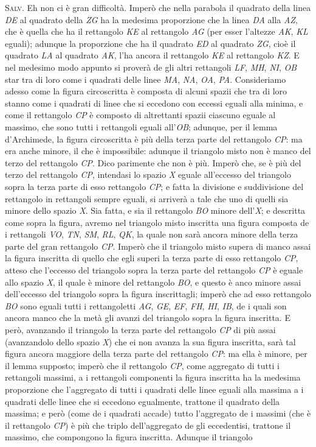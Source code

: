 \documentclass[11pt,twoside,openany]{book}
\newcommand{\speaker}[1]{\textcolor{rubric}{\textsc{#1}}\space}
\begin{document}
\speaker{Salv.} Eh non ci è gran difficoltà. Imperò che nella parabola il quadrato della linea \emph{DE} al quadrato della \emph{ZG} ha la medesima proporzione che la linea \emph{DA} alla \emph{AZ}, che è quella che ha il rettangolo \emph{KE} al rettangolo \emph{AG} (per esser l'altezze \emph{AK}, \emph{KL} eguali); adunque la proporzione che ha il quadrato \emph{ED} al quadrato \emph{ZG}, cioè il quadrato \emph{LA} al quadrato \emph{AK}, l'ha ancora il rettangolo \emph{KE} al rettangolo \emph{KZ}. E nel medesimo modo appunto si proverà de gli altri rettangoli \emph{LF}, \emph{MH}, \emph{NI}, \emph{OB} star tra di loro come i quadrati delle linee \emph{MA}, \emph{NA}, \emph{OA}, \emph{PA}. Consideriamo adesso come la figura circoscritta è composta di alcuni spazii che tra di loro stanno come i quadrati di linee che si eccedono con eccessi eguali alla minima, e come il rettangolo \emph{CP} è composto di altrettanti spazii ciascuno eguale al massimo, che sono tutti i rettangoli eguali all'\emph{OB}; adunque, per il lemma d'Archimede, la figura circoscritta è più della terza parte del rettangolo \emph{CP}: ma era anche minore, il che è impossibile: adunque il triangolo misto non è manco del terzo del rettangolo \emph{CP}. Dico parimente che non è più. Imperò che, se è più del terzo del rettangolo \emph{CP}, intendasi lo spazio \emph{X} eguale all'eccesso del triangolo sopra la terza parte di esso rettangolo \emph{CP}; e fatta la divisione e suddivisione del rettangolo in rettangoli sempre eguali, si arriverà a tale che uno di quelli sia minore dello spazio \emph{X}. Sia fatta, e sia il rettangolo \emph{BO} minore dell'\emph{X}; e descritta come sopra la figura, avremo nel triangolo misto inscritta una figura composta de i rettangoli \emph{VO}, \emph{TN}, \emph{SM}, \emph{RL}, \emph{QK}, la quale non sarà ancora minore della terza parte del gran rettangolo \emph{CP}. Imperò che il triangolo misto supera di manco assai la figura inscritta di quello che egli superi la terza parte di esso rettangolo \emph{CP}, atteso che l'eccesso del triangolo sopra la terza parte del rettangolo \emph{CP} è eguale allo spazio \emph{X}, il quale è minore del rettangolo \emph{BO}, e questo è anco minore assai dell'eccesso del triangolo sopra la figura inscrittagli; imperò che ad esso rettangolo \emph{BO} sono eguali tutti i rettangoletti \emph{AG}, \emph{GE}, \emph{EF}, \emph{FH}, \emph{HI}, \emph{IB}, de i quali son ancora manco che la metà gli avanzi del triangolo sopra la figura inscritta. E però, avanzando il triangolo la terza parte del rettangolo \emph{CP} di più assai (avanzandolo dello spazio \emph{X}) che ei non avanza la sua figura inscritta, sarà tal figura ancora maggiore della terza parte del rettangolo \emph{CP}: ma ella è minore, per il lemma supposto; imperò che il rettangolo \emph{CP}, come aggregato di tutti i rettangoli massimi, a i rettangoli componenti la figura inscritta ha la medesima proporzione che l'aggregato di tutti i quadrati delle linee eguali alla massima a i quadrati delle linee che si eccedono egualmente, trattone il quadrato della massima; e però (come de i quadrati accade) tutto l'aggregato de i massimi (che è il rettangolo \emph{CP}) è più che triplo dell'aggregato de gli eccedentisi, trattone il massimo, che compongono la figura inscritta. Adunque il triangolo 
\end{document}
